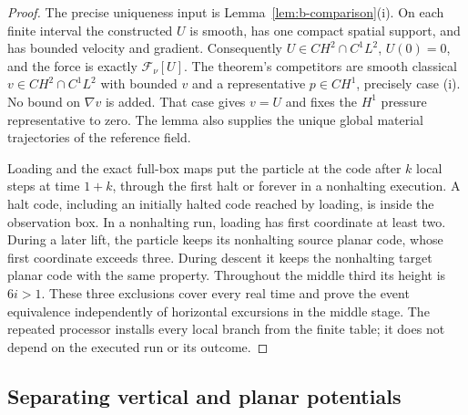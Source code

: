 \begin{proof}
The precise uniqueness input is Lemma~\ref{lem:b-comparison}(i).
On each finite interval the constructed $U$ is smooth, has one compact
spatial support, and has bounded velocity and gradient.  Consequently
$U\in CH^2\cap C^1L^2$, $U(0)=0$, and the force is exactly
$\mathcal F_\nu[U]$.  The theorem's competitors are smooth classical
$v\in CH^2\cap C^1L^2$ with bounded $v$ and a representative
$p\in CH^1$, precisely case (i).  No bound on $\nabla v$ is added.
That case gives $v=U$ and fixes the $H^1$ pressure representative to
zero.  The lemma also supplies the unique global material trajectories
of the reference field.

Loading and the exact full-box maps put the particle at the code after
$k$ local steps at time $1+k$, through the first halt or forever in a
nonhalting execution.  A halt code, including an initially halted code
reached by loading, is inside the observation box.  In a nonhalting
run, loading has first coordinate at least two.  During a later lift,
the particle keeps its nonhalting source planar code, whose first
coordinate exceeds three.  During descent it keeps the nonhalting
target planar code with the same property.  Throughout the middle
third its height is $6i>1$.  These three exclusions cover every real
time and prove the event equivalence independently of horizontal
excursions in the middle stage.  The repeated processor installs every
local branch from the finite table; it does not depend on the executed
run or its outcome.
\end{proof}


\subsection{Separating vertical and planar potentials}

